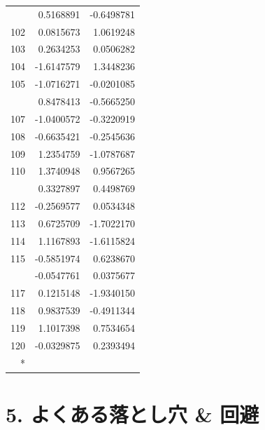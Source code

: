 \documentclass[
  japanese,
  letterpaper,
  DIV=11,
  numbers=noendperiod]{scrartcl}
\begin{document}
\begin{longtable}[t]{rrr}
\addlinespace
101 & 0.5168891 & -0.6498781\\
102 & 0.0815673 & 1.0619248\\
103 & 0.2634253 & 0.0506282\\
104 & -1.6147579 & 1.3448236\\
105 & -1.0716271 & -0.0201085\\
\addlinespace
106 & 0.8478413 & -0.5665250\\
107 & -1.0400572 & -0.3220919\\
108 & -0.6635421 & -0.2545636\\
109 & 1.2354759 & -1.0787687\\
110 & 1.3740948 & 0.9567265\\
\addlinespace
111 & 0.3327897 & 0.4498769\\
112 & -0.2569577 & 0.0534348\\
113 & 0.6725709 & -1.7022170\\
114 & 1.1167893 & -1.6115824\\
115 & -0.5851974 & 0.6238670\\
\addlinespace
116 & -0.0547761 & 0.0375677\\
117 & 0.1215148 & -1.9340150\\
118 & 0.9837539 & -0.4911344\\
119 & 1.1017398 & 0.7534654\\
120 & -0.0329875 & 0.2393494\\*

\end{longtable}

\section{5. よくある落とし穴 \&
回避}\label{ux3088ux304fux3042ux308bux843dux3068ux3057ux7a74-ux56deux907f}
\end{document}
